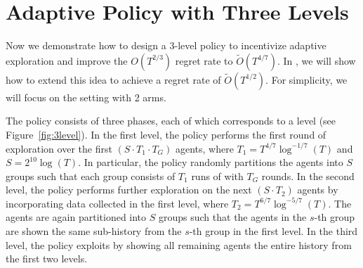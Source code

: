 
\section{Adaptive Policy with Three Levels}
\label{sec:3level}
Now we demonstrate how to design a 3-level policy to incentivize
adaptive exploration and improve the $O(T^{2/3})$ regret rate to
$\tilde O(T^{4/7})$. In , we will show how to extend
this idea to achieve a regret rate of $\tilde O(T^{1/2})$. For
simplicity, we will focus on the setting with 2 arms. 


The policy consists of three phases, each of which corresponds to a
level (see Figure~\ref{fig:3level}).  In the first level, the policy
performs the first round of exploration over the first
$(S\cdot T_1\cdot T_G)$ agents, where $T_1 = T^{4/7}\log^{-1/7}(T)$
and $S = 2^{10}\log(T)$. In particular, the policy randomly partitions
the agents into $S$ groups such that each group consists of $T_1$ runs
of \ALGG with $T_G$ rounds. In the second level, the policy performs
further exploration on the next $(S\cdot T_2)$ agents by incorporating
data collected in the first level, where
$T_2 = T^{6/7}\log^{-5/7}(T)$. The agents are again partitioned into
$S$ groups such that the agents in the $s$-th group are shown the same
sub-history from the $s$-th group in the first level. In the third
level, the policy exploits by showing all remaining agents the entire
history from the first two levels. 


